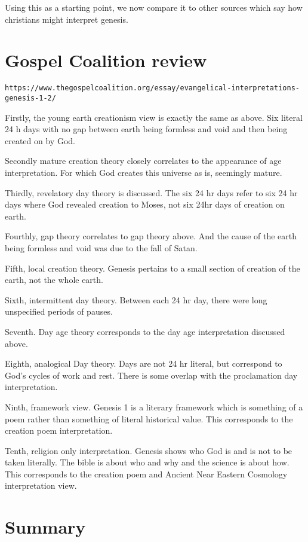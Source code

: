 \documentclass[11]{article}
\begin{document}
Using this as a starting point, we now compare it to other sources which say how christians might interpret genesis. 

\section{Gospel Coalition review}

\begin{verbatim}
https://www.thegospelcoalition.org/essay/evangelical-interpretations-genesis-1-2/
\end{verbatim}

Firstly, the young earth creationism view is exactly the same as above. Six literal 24 h days with no gap between earth being formless and void and then being created on by God.

Secondly mature creation theory closely correlates to the appearance of age interpretation. For which God creates this universe as is, seemingly mature. 

Thirdly, revelatory day theory is discussed. The six 24 hr days refer to six 24 hr days where God revealed creation to Moses, not six 24hr days of creation on earth.

Fourthly, gap theory correlates to gap theory above. And the cause of the earth being formless and void was due to the fall of Satan. 

Fifth, local creation theory. Genesis pertains to a small section of creation of the earth, not the whole earth.

Sixth, intermittent day theory. Between each 24 hr day, there were long unspecified periods of pauses. 

Seventh. Day age theory corresponds to the day age interpretation discussed above.

Eighth, analogical Day theory. Days are not 24 hr literal, but correspond to God's cycles of work and rest. There is some overlap with the proclamation day interpretation.

Ninth, framework view. Genesis 1 is a literary framework which is something of a poem rather than something of literal historical value. This corresponds to the creation poem interpretation. 

Tenth, religion only interpretation. Genesis shows who God is and is not to be taken literally. The bible is about who and why and the science is about how. This corresponds to the creation poem and Ancient Near Eastern Cosmology interpretation view.

\section{Summary}
\end{document}
